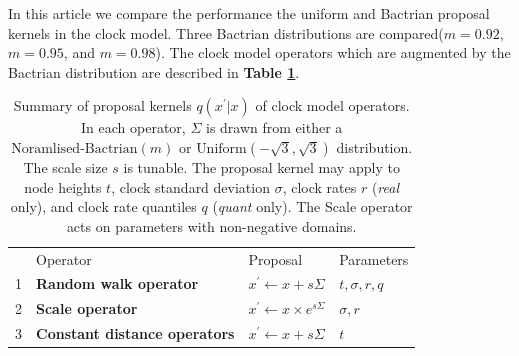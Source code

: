 \documentclass[10pt,letterpaper]{article}
\begin{document}
In this article we compare the performance the uniform and Bactrian proposal kernels in the clock model. Three Bactrian distributions are compared($m=0.92$, $m=0.95$, and $m=0.98$). The clock model operators which are augmented by the Bactrian distribution are described in \textbf{Table \ref{table:kernels}}.






\begin{table}[h!]
\centering
\begin{tabular}{|l| l l l|} 
 \hline
 & Operator & Proposal & Parameters  \\
 1 & \textbf{Random walk operator} & $x^\prime \leftarrow x + s\Sigma$ & $t, \sigma, r, q$ \\
 2 & \textbf{Scale operator} & $x^\prime \leftarrow x \times e^{s\Sigma}$ & $\sigma, r$  \\
 3 & \textbf{Constant distance operators} & $x^\prime \leftarrow x + s\Sigma$ & $t$ \\
 \hline
\end{tabular}
\caption{Summary of proposal kernels $q(x^\prime|x)$ of clock model operators. In each operator, $\Sigma$ is drawn from either a $\text{Noramlised-Bactrian}(m)$ or $\text{Uniform}(-\sqrt{3},\sqrt{3})$ distribution. The scale size $s$ is tunable. The proposal kernel may apply to node heights $t$, clock standard deviation $\sigma$, clock rates $r$ (\textit{real} only), and clock rate quantiles $q$ (\textit{quant} only). The Scale operator acts on parameters with non-negative domains. }
\label{table:kernels}
\end{table}




\newpage
\end{document}
